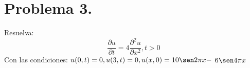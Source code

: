 \section{Problema 3.} Resuelva: $$\frac{\partial u}{\partial t}=4 \frac{\partial^{2} u}{\partial x^{2}}, t>0$$
Con las condiciones: $u(0, t)=0, u(3, t)=0, u(x, 0)=10 \sen 2 \pi x-$
$6 \sen 4 \pi x$
